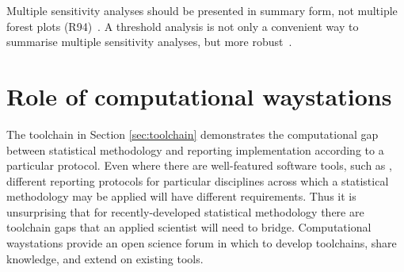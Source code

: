 \documentclass[12pt]{article}\usepackage[]{graphicx}\usepackage[]{color}
\newcommand{\package}[1]{\texttt{\detokenize{#1::}}}
\begin{document}

Multiple sensitivity analyses should be presented in summary form, not multiple forest plots (R94)~\cite{higgins_methodological_2016}. A threshold analysis is not only a convenient way to summarise multiple sensitivity analyses, but more robust~\cite{phillippo_threshold_2019}.




\section{Role of computational waystations}

The toolchain in Section \ref{sec:toolchain} demonstrates the computational gap between statistical methodology and reporting implementation according to a particular protocol. Even where there are well-featured software tools, such as \package{multinma}, different reporting protocols for particular disciplines across which a statistical methodology may be applied will have different requirements. Thus it is unsurprising that for recently-developed statistical methodology there are toolchain gaps that an applied scientist will need to bridge. Computational waystations provide an open science forum in which to develop toolchains, share knowledge, and extend on existing tools.



\end{document}
